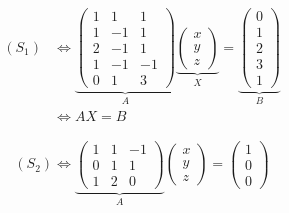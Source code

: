 \begin{exm}
	\begin{align*}
		(S_1) &\iff 
		\underbrace{\begin{pmatrix}
			1 & 1 & 1\\
			1 & -1 & 1\\
			2 & -1 & 1\\
			1 & -1 & -1\\
			0 & 1 & 3
		\end{pmatrix}} _{A}
		\underbrace{\begin{pmatrix}
			x\\y\\z
		\end{pmatrix}}_{X} =
		\underbrace{\begin{pmatrix}
			0\\1\\2\\3\\1
		\end{pmatrix}}_{B}\\
		&\iff AX = B
	\end{align*}

	\begin{align*}
		(S_2) \iff 
		\underbrace{\begin{pmatrix}
			1&1&-1\\
			0&1&1\\
			1&2&0
		\end{pmatrix}}_{A}
		\begin{pmatrix}
			x\\y\\z
		\end{pmatrix}
		=
		\begin{pmatrix}
			1\\0\\0
		\end{pmatrix} 
	\end{align*}


\end{exm}

